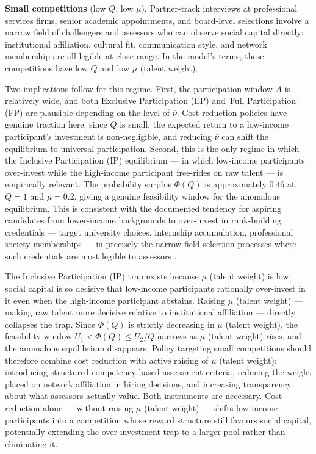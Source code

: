 \documentclass[
    oneside,
    fontsize=10pt,leqno]{article}
\begin{document}
\medskip
\noindent\textbf{Small competitions} (low $Q$, low $\mu$). Partner-track
interviews at professional services firms, senior academic
appointments, and board-level selections involve a narrow field of
challengers and assessors who can observe social capital directly:
institutional affiliation, cultural fit, communication style, and
network membership are all legible at close range. In the model's
terms, these competitions have low $Q$ and low $\mu$ (talent weight).

Two implications follow for this regime. First, the participation
window $A$ is relatively wide, and both Exclusive Participation (EP) and~Full Participation (FP) are plausible
depending on the level of $\overline{\nu}$. Cost-reduction policies
have genuine traction here: since $Q$ is small, the expected return
to a low-income participant's investment is non-negligible, and
reducing $\overline{\nu}$ can shift the equilibrium to universal
participation. Second, this is the only regime in which the
Inclusive Participation (IP) equilibrium --- in which low-income participants over-invest
while the high-income participant free-rides on raw talent --- is
empirically relevant. The probability surplus $\Phi(Q)$ is
approximately $0.46$ at $Q=1$ and $\mu=0.2$, giving a genuine
feasibility window for the anomalous equilibrium. This is consistent
with the documented tendency for aspiring candidates from
lower-income backgrounds to over-invest in rank-building credentials ---
target university choices, internship accumulation, professional
society memberships --- in precisely the narrow-field selection
processes where such credentials are most legible to assessors
\citep{Rivera2015Pedigree}.

The Inclusive Participation (IP) trap exists because $\mu$ (talent weight) is low: social capital is so
decisive that low-income participants rationally over-invest in it
even when the high-income participant abstains. Raising $\mu$ (talent weight) ---
making raw talent more decisive relative to institutional affiliation
--- directly collapses the trap. Since $\Phi(Q)$ is strictly
decreasing in $\mu$ (talent weight), the feasibility window $U_1 < \Phi(Q) \leq
U_2/Q$ narrows as $\mu$ (talent weight) rises, and the anomalous equilibrium
disappears. Policy targeting small competitions should therefore
combine cost reduction with active raising of $\mu$ (talent weight): introducing
structured competency-based assessment criteria, reducing the weight
placed on network affiliation in hiring decisions, and increasing
transparency about what assessors actually value. Both instruments
are necessary. Cost reduction alone --- without raising $\mu$ (talent weight) ---
shifts low-income participants into a competition whose reward
structure still favours social capital, potentially extending the
over-investment trap to a larger pool rather than eliminating it.
\end{document}

